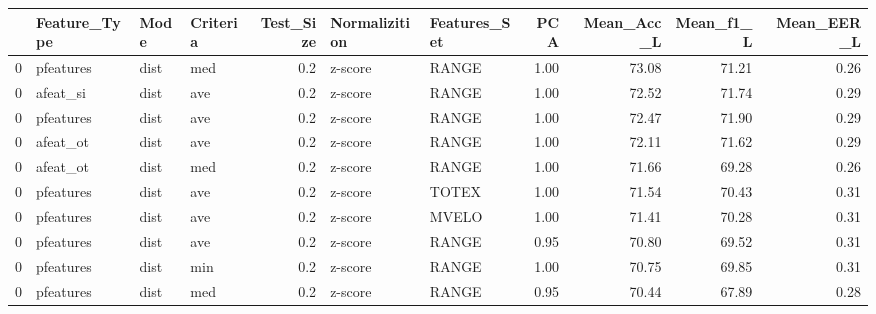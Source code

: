 \begin{tabular}{llllrllrrrr}
\toprule
{} & Feature\_Type &  Mode & Criteria &  Test\_Size & Normalizition & Features\_Set &   PCA &  Mean\_Acc\_L &  Mean\_f1\_L &  Mean\_EER\_L \\
\midrule
0 &    pfeatures &  dist &      med &        0.2 &       z-score &        RANGE &  1.00 &       73.08 &      71.21 &        0.26 \\
0 &     afeat\_si &  dist &      ave &        0.2 &       z-score &        RANGE &  1.00 &       72.52 &      71.74 &        0.29 \\
0 &    pfeatures &  dist &      ave &        0.2 &       z-score &        RANGE &  1.00 &       72.47 &      71.90 &        0.29 \\
0 &     afeat\_ot &  dist &      ave &        0.2 &       z-score &        RANGE &  1.00 &       72.11 &      71.62 &        0.29 \\
0 &     afeat\_ot &  dist &      med &        0.2 &       z-score &        RANGE &  1.00 &       71.66 &      69.28 &        0.26 \\
0 &    pfeatures &  dist &      ave &        0.2 &       z-score &        TOTEX &  1.00 &       71.54 &      70.43 &        0.31 \\
0 &    pfeatures &  dist &      ave &        0.2 &       z-score &        MVELO &  1.00 &       71.41 &      70.28 &        0.31 \\
0 &    pfeatures &  dist &      ave &        0.2 &       z-score &        RANGE &  0.95 &       70.80 &      69.52 &        0.31 \\
0 &    pfeatures &  dist &      min &        0.2 &       z-score &        RANGE &  1.00 &       70.75 &      69.85 &        0.31 \\
0 &    pfeatures &  dist &      med &        0.2 &       z-score &        RANGE &  0.95 &       70.44 &      67.89 &        0.28 \\
\bottomrule
\end{tabular}
